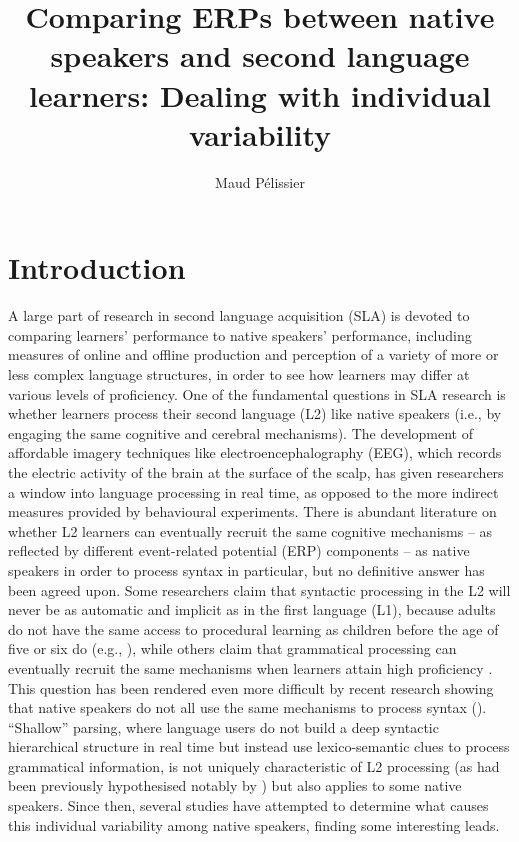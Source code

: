 \documentclass[output=paper,colorlinks,citecolor=brown,modfonts,nonflat]{../langscibook}
\author{Maud Pélissier\affiliation{University of Agder}\orcid{}}
\title{Comparing ERPs between native speakers and second language learners: Dealing with individual variability}
\begin{document}
\maketitle 
{}

\section{Introduction}
A large part of research in second language acquisition (SLA) is devoted to comparing learners’ performance to native speakers’ performance, including measures of online and offline production and perception of a variety of more or less complex language structures, in order to see how learners may differ at various levels of proficiency. One of the fundamental questions in SLA research is whether learners process their second language (L2) like native speakers (i.e., by engaging the same cognitive and cerebral mechanisms). The development of affordable imagery techniques like electroencephalography (EEG), which records the electric activity of the brain at the surface of the scalp, has given researchers a window into language processing in real time, as opposed to the more indirect measures provided by behavioural experiments. There is abundant literature on whether L2 learners can eventually recruit the same cognitive mechanisms – as reflected by different event-related potential (ERP) components – as native speakers in order to process syntax in particular, but no definitive answer has been agreed upon. Some researchers claim that syntactic processing in the L2 will never be as automatic and implicit as in the first language (L1), because adults do not have the same access to procedural learning as children before the age of five or six do (e.g., \citealt{Birdsong2006,ClahsenFelser2006,ClahsenFelser2018,Paradis2009}), while others claim that grammatical processing can eventually recruit the same mechanisms when learners attain high proficiency \citep{SteinhauerEtAl2009}. This question has been rendered even more difficult by recent research showing that native speakers do not all use the same mechanisms to process syntax (\citealt{TannerEtAl2013,TannerEtAl2014,TannerHell2014,Tanner2019}). “Shallow” parsing, where language users do not build a deep syntactic hierarchical structure in real time but instead use lexico-semantic clues to process grammatical information, is not uniquely characteristic of L2 processing (as had been previously hypothesised notably by \citealt{ClahsenFelser2006}) but also applies to some native speakers. Since then, several studies have attempted to determine what causes this individual variability among native speakers, finding some interesting leads.
\end{document}
